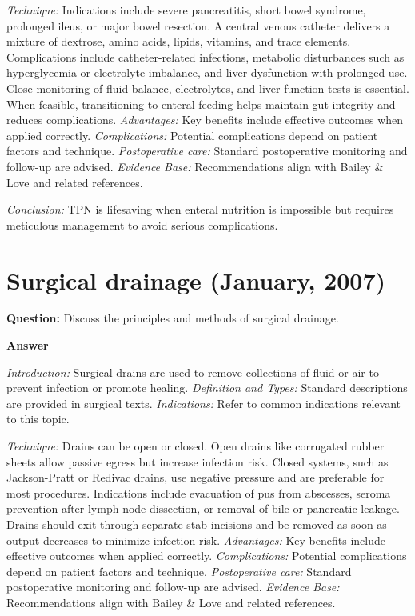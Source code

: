 \documentclass{article}
\begin{document}
\emph{Technique:} Indications include severe pancreatitis, short bowel syndrome, prolonged ileus, or major bowel resection. A central venous catheter delivers a mixture of dextrose, amino acids, lipids, vitamins, and trace elements. Complications include catheter-related infections, metabolic disturbances such as hyperglycemia or electrolyte imbalance, and liver dysfunction with prolonged use. Close monitoring of fluid balance, electrolytes, and liver function tests is essential. When feasible, transitioning to enteral feeding helps maintain gut integrity and reduces complications.
\emph{Advantages:} Key benefits include effective outcomes when applied correctly.
\emph{Complications:} Potential complications depend on patient factors and technique.
\emph{Postoperative care:} Standard postoperative monitoring and follow-up are advised.
\emph{Evidence Base:} Recommendations align with Bailey & Love and related references.

\emph{Conclusion:} TPN is lifesaving when enteral nutrition is impossible but requires meticulous management to avoid serious complications.


\section{Surgical drainage (January, 2007)}

\textbf{Question:} Discuss the principles and methods of surgical drainage.

\textbf{Answer}

\emph{Introduction:} Surgical drains are used to remove collections of fluid or air to prevent infection or promote healing.
\emph{Definition and Types:} Standard descriptions are provided in surgical texts.
\emph{Indications:} Refer to common indications relevant to this topic.

\emph{Technique:} Drains can be open or closed. Open drains like corrugated rubber sheets allow passive egress but increase infection risk. Closed systems, such as Jackson-Pratt or Redivac drains, use negative pressure and are preferable for most procedures. Indications include evacuation of pus from abscesses, seroma prevention after lymph node dissection, or removal of bile or pancreatic leakage. Drains should exit through separate stab incisions and be removed as soon as output decreases to minimize infection risk.
\emph{Advantages:} Key benefits include effective outcomes when applied correctly.
\emph{Complications:} Potential complications depend on patient factors and technique.
\emph{Postoperative care:} Standard postoperative monitoring and follow-up are advised.
\emph{Evidence Base:} Recommendations align with Bailey & Love and related references.
\end{document}
